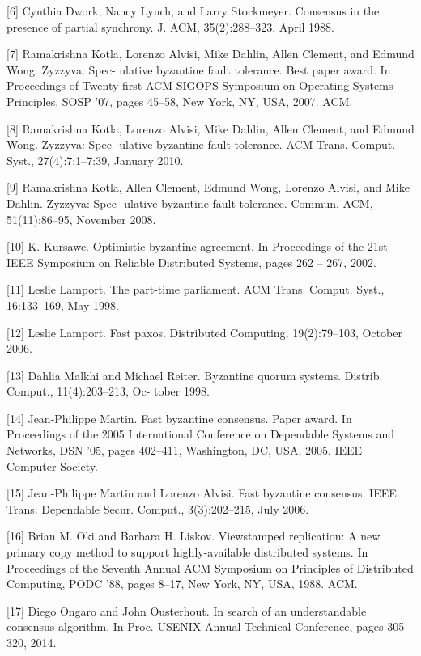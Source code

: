 \documentclass[UTF8]{ctexart}
\begin{document}
[6] Cynthia Dwork, Nancy Lynch, and Larry Stockmeyer. Consensus in the presence of partial synchrony. J. ACM, 35(2):288–323, April 1988.

[7] Ramakrishna Kotla, Lorenzo Alvisi, Mike Dahlin, Allen Clement, and Edmund Wong. Zyzzyva: Spec- ulative byzantine fault tolerance. Best paper award. In Proceedings of Twenty-first ACM SIGOPS Symposium on Operating Systems Principles, SOSP ’07, pages 45–58, New York, NY, USA, 2007. ACM.

[8] Ramakrishna Kotla, Lorenzo Alvisi, Mike Dahlin, Allen Clement, and Edmund Wong. Zyzzyva: Spec- ulative byzantine fault tolerance. ACM Trans. Comput. Syst., 27(4):7:1–7:39, January 2010.

[9] Ramakrishna Kotla, Allen Clement, Edmund Wong, Lorenzo Alvisi, and Mike Dahlin. Zyzzyva: Spec- ulative byzantine fault tolerance. Commun. ACM, 51(11):86–95, November 2008.

[10] K. Kursawe. Optimistic byzantine agreement. In Proceedings of the 21st IEEE Symposium on Reliable Distributed Systems, pages 262 – 267, 2002.

[11] Leslie Lamport. The part-time parliament. ACM Trans. Comput. Syst., 16:133–169, May 1998.

[12] Leslie Lamport. Fast paxos. Distributed Computing, 19(2):79–103, October 2006.

[13] Dahlia Malkhi and Michael Reiter. Byzantine quorum systems. Distrib. Comput., 11(4):203–213, Oc- tober 1998.

[14] Jean-Philippe Martin. Fast byzantine consensus. Paper award. In Proceedings of the 2005 International Conference on Dependable Systems and Networks, DSN ’05, pages 402–411, Washington, DC, USA, 2005. IEEE Computer Society.

[15] Jean-Philippe Martin and Lorenzo Alvisi. Fast byzantine consensus. IEEE Trans. Dependable Secur. Comput., 3(3):202–215, July 2006.

[16] Brian M. Oki and Barbara H. Liskov. Viewstamped replication: A new primary copy method to support highly-available distributed systems. In Proceedings of the Seventh Annual ACM Symposium on Principles of Distributed Computing, PODC ’88, pages 8–17, New York, NY, USA, 1988. ACM.

[17] Diego Ongaro and John Ousterhout. In search of an understandable consensus algorithm. In Proc. USENIX Annual Technical Conference, pages 305–320, 2014.
\end{document}
